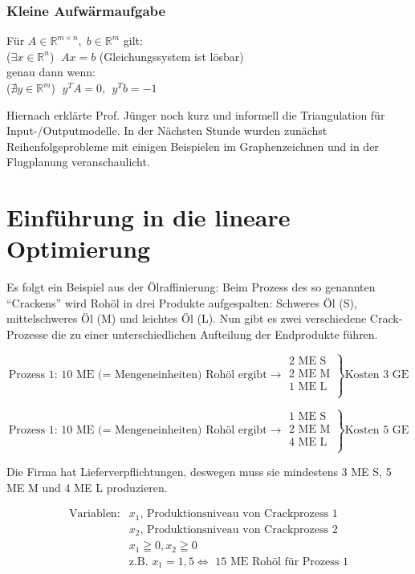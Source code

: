 \documentclass[12pt,titlepage,a4paper] {report}
\newcommand{\RR}{\mathbb{R}}
\begin{document}
\subsubsection{Kleine Aufwärmaufgabe}

Für $A \in \RR^{m\times n}, \; b \in \RR^{m}$ gilt:\\
($\exists x \in \RR^{n}$) $\;Ax = b$ (Gleichungssystem ist lösbar)\\
genau dann wenn:\\
($\nexists y \in \RR^{m}$) $\;y^{T}A=0$, $\;y^{T} b=-1$

Hiernach erklärte Prof. Jünger noch kurz und informell die Triangulation
für Input-/Outputmodelle. In der Nächsten Stunde wurden zunächst 
Reihenfolgeprobleme mit einigen Beispielen im Graphenzeichnen und in der 
Flugplanung veranschaulicht.

\section{Einführung in die lineare Optimierung}

Es folgt ein Beispiel aus der Ölraffinierung: Beim Prozess des so genannten
"`Crackens"' wird Rohöl in drei Produkte aufgespalten: Schweres Öl (S),
mittelschweres Öl (M) und leichtes Öl (L). Nun gibt es zwei verschiedene
Crack-Prozesse die zu einer unterschiedlichen Aufteilung der Endprodukte
führen.

\[\mbox{Prozess 1: 10 ME (= Mengeneinheiten) Rohöl ergibt} \longrightarrow 
\left. \begin{array}{l}
\mbox{2 ME S}\\
\mbox{2 ME M}\\
\mbox{1 ME L}\\
\end{array}\right\} \mbox{Kosten 3 GE}\]

\[\mbox{Prozess 1: 10 ME (= Mengeneinheiten) Rohöl ergibt} \longrightarrow
\left.
\begin{array}{l}
\mbox{1 ME S}\\
\mbox{2 ME M}\\
\mbox{4 ME L}\\
\end{array}\right\}\mbox{Kosten 5 GE}\]

Die Firma hat Lieferverpflichtungen, deswegen muss sie mindestens 3 ME S, 5
ME M und 4 ME L produzieren.

\[\begin{array}{ll}
\mbox{Variablen:}& x_{1}\mbox{, Produktionsniveau von Crackprozess 1}\\
&x_{2}\mbox{, Produktionsniveau von Crackprozess 2}\\
&x_{1}\geqq 0, x_{2}\geqq 0\\
&\mbox{z.B. }x_{1} = 1,5 \Leftrightarrow \mbox{ 15 ME Rohöl für Prozess 1}
\end{array}\]
\end{document}
